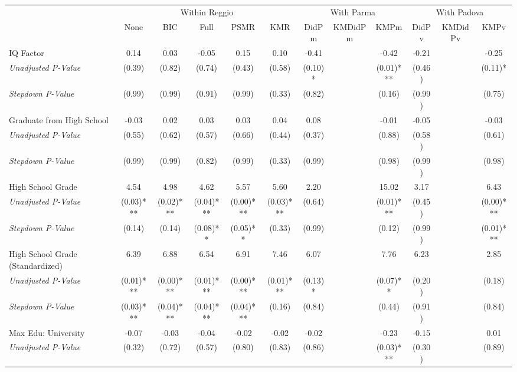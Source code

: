 \begin{tabular}{l c c c c c c c c c c c}
\toprule
& \multicolumn{5}{c}{Within Reggio} & \multicolumn{3}{c}{With Parma} & \multicolumn{3}{c}{With Padova} \\\cmidrule(lr){2-6} \cmidrule(lr){7-9} \cmidrule(lr){10-12}
 & None & BIC & Full & PSMR & KMR & DidPm & KMDidPm & KMPm & DidPv & KMDidPv & KMPv \\
\midrule
IQ Factor & 0.14 & 0.03 & -0.05 & 0.15 & 0.10 & -0.41 & & -0.42 & -0.21 & & -0.25 \\
\quad \textit{Unadjusted P-Value} & (0.39) & (0.82) & (0.74) & (0.43) & (0.58) & (0.10)* & & (0.01)*** & (0.46) & & (0.11)* \\
\quad \textit{Stepdown P-Value} & (0.99) & (0.99) & (0.91) & (0.99) & (0.33) & (0.82) & & (0.16) & (0.99) & & (0.75) \\
Graduate from High School & -0.03 & 0.02 & 0.03 & 0.03 & 0.04 & 0.08 & & -0.01 & -0.05 & & -0.03 \\
\quad \textit{Unadjusted P-Value} & (0.55) & (0.62) & (0.57) & (0.66) & (0.44) & (0.37) & & (0.88) & (0.58) & & (0.61) \\
\quad \textit{Stepdown P-Value} & (0.99) & (0.99) & (0.82) & (0.99) & (0.33) & (0.99) & & (0.98) & (0.99) & & (0.98) \\
High School Grade & 4.54 & 4.98 & 4.62 & 5.57 & 5.60 & 2.20 & & 15.02 & 3.17 & & 6.43 \\
\quad \textit{Unadjusted P-Value} & (0.03)*** & (0.02)*** & (0.04)*** & (0.00)*** & (0.03)*** & (0.64) & & (0.01)*** & (0.45) & & (0.00)*** \\
\quad \textit{Stepdown P-Value} & (0.14) & (0.14) & (0.08)** & (0.05)** & (0.33) & (0.99) & & (0.12) & (0.99) & & (0.01)*** \\
High School Grade (Standardized) & 6.39 & 6.88 & 6.54 & 6.91 & 7.46 & 6.07 & & 7.76 & 6.23 & & 2.85 \\
\quad \textit{Unadjusted P-Value} & (0.01)*** & (0.00)*** & (0.01)*** & (0.00)*** & (0.01)*** & (0.13)* & & (0.07)** & (0.20) & & (0.18) \\
\quad \textit{Stepdown P-Value} & (0.03)*** & (0.04)*** & (0.04)*** & (0.04)*** & (0.16) & (0.84) & & (0.44) & (0.91) & & (0.84) \\
Max Edu: University & -0.07 & -0.03 & -0.04 & -0.02 & -0.02 & -0.02 & & -0.23 & -0.15 & & 0.01 \\
\quad \textit{Unadjusted P-Value} & (0.32) & (0.72) & (0.57) & (0.80) & (0.83) & (0.86) & & (0.03)*** & (0.30) & & (0.89) \\

\end{tabular}
